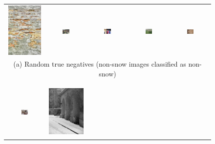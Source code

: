 \begin{figure}[th]
{\small{
\begin{center}
\begin{tabular}{@{}c@{\,\,\,}c@{\,\,\,}c@{\,\,\,}c@{\,\,\,}c@{\,\,\,}}
\includegraphics[height=1.05in]{figs/tn1.jpg} &
\includegraphics[width=0.19\textwidth]{figs/tn3.jpg} &
\includegraphics[width=0.19\textwidth]{figs/tn5.jpg} &
\includegraphics[width=0.19\textwidth]{figs/tn7.jpg} &
\includegraphics[width=0.19\textwidth]{figs/tn9.jpg} \\
\multicolumn{5}{c}{(a) Random true negatives (non-snow images classified as non-snow)} \\
\\[-6pt]
 \hline
\\[-6pt]
\includegraphics[width=0.19\textwidth]{figs/tp1.jpg} &
\includegraphics[height=1.05in]{figs/tp3.jpg} &

\end{tabular}
\end{center}}}
\end{figure}
